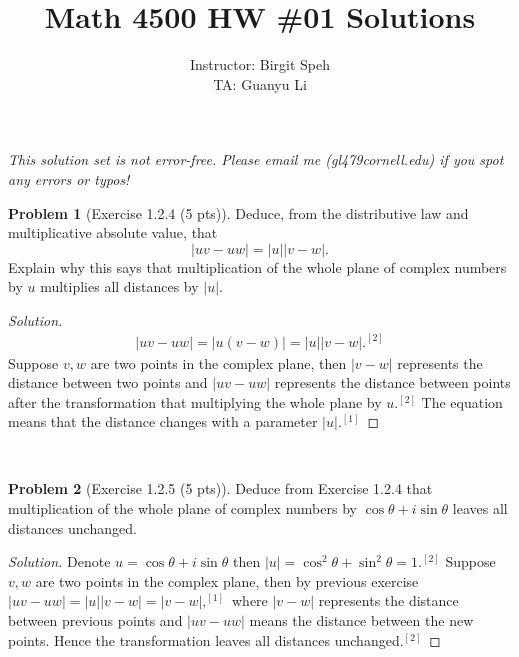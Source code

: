 \documentclass{article}
\title{Math 4500 HW \#01 Solutions}
\author{Instructor: Birgit Speh\\ TA: Guanyu Li}
\date{}
\theoremstyle{definition}
\newtheorem{problem}{Problem}
\theoremstyle{plain}
\begin{document}
\maketitle\par

\emph{This solution set is not error-free. Please email me (gl479\MVAt cornell.edu) if you spot any errors or typos!}

\begin{problem}[Exercise 1.2.4 (5 pts)]Deduce, from the distributive law and multiplicative absolute value, that
\begin{displaymath}
|uv-uw|=|u||v-w|.
\end{displaymath}
Explain why this says that multiplication of the whole plane of complex numbers by $u$ multiplies all distances by $|u|$.
\end{problem}
\begin{adjustwidth}{0.7cm}{}
\color{blue}
\begin{proof}[Solution]
\begin{align*}
|uv-uw|=|u(v-w)|=|u||v-w|.^{[2]}
\end{align*}
Suppose $v,w$ are two points in the complex plane, then $|v-w|$ represents the distance between two points and $|uv-uw|$ represents the distance between points after the transformation that multiplying the whole plane by $u.^{[2]}$ The equation means that the distance changes with a parameter $|u|.^{[1]}$
\end{proof}
\color{black}
\end{adjustwidth}
~\par

\begin{problem}[Exercise 1.2.5 (5 pts)]Deduce from Exercise 1.2.4 that multiplication of the whole plane of complex numbers by $\cos\theta+i\sin\theta$ leaves all distances unchanged.
\end{problem}
\begin{adjustwidth}{0.7cm}{}
\color{blue}
\begin{proof}[Solution]Denote $u=\cos\theta+i\sin\theta$ then $|u|=\cos^2\theta+\sin^2\theta=1.^{[2]}$ Suppose $v,w$ are two points in the complex plane, then by previous exercise $|uv-uw|=|u||v-w|=|v-w|,^{[1]}$ where $|v-w|$ represents the distance between previous points and $|uv-uw|$ means the distance between the new points. Hence the transformation leaves all distances unchanged$.^{[2]}$
\end{proof}
\color{black}
\end{adjustwidth}
~\par
\end{document}
